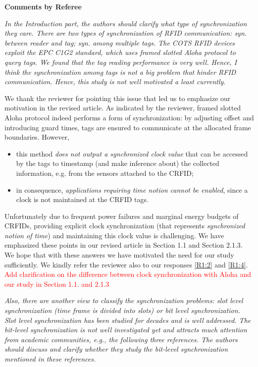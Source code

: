 \documentclass[10pt]{article}
\newcommand{\referee}[1]{
	{\item \color{OliveGreen} \emph{{#1}}}
	\label{R\therefereeCounter:\arabic{enumi}}
}
\newcommand{\response}[1]{{\color{blue} #1}}
\newcounter{refereeCounter}
\newenvironment{responses}{%
\refstepcounter{refereeCounter}%
\textbf{\large Comments by Referee \therefereeCounter}
\begin{enumerate}%
\renewcommand{\labelenumi}{\textbf{[R\therefereeCounter :\,\arabic{enumi}]}} %
}{\end{enumerate}}
\begin{document}
\begin{responses}
 
\referee{In the Introduction part, the authors should clarify what type of synchronization they care. There are two types of synchronization of RFID communication: syn. between reader and tag; syn. among multiple tags. The COTS RFID devices exploit the EPC C1G2 standard, which uses framed slotted Aloha protocol to query tags. We found that the tag reading performance is very well. Hence, I think the synchronization among tags is not a big problem that hinder RFID communication. Hence, this study is not well motivated a least currently.}

\response{
We thank the reviewer for pointing this issue that led us to emphasize our motivation in the revised article. As indicated by the reviewer, framed slotted Aloha protocol indeed performs a form of synchronization: by adjusting offset and introducing guard times, tags are ensured to communicate at the allocated frame boundaries. However, 

\begin{itemize}
	\item this method \emph{does not output a synchronized clock value} that can be accessed by the tags to timestamp (and make inference about) the collected information, e.g. from the sensors attached to the CRFID;
	\item in consequence, \emph{applications requiring time notion cannot be enabled}, since a clock is not maintained at the CRFID tags.
\end{itemize}

Unfortunately due to frequent power failures and marginal energy budgets of CRFIDs, providing explicit clock synchronization (that represents \emph{synchronized notion of time}) and maintaining this clock value is challenging. We have emphasized these points in our revised article in Section 1.1 and Section 2.1.3. We hope that with these answers we have motivated the need for our study sufficiently. We kindly refer the reviewer also to our responses \hyperref[R1:2]{[R1:2]} and \hyperref[R1:4]{[R1:4]}. \textcolor{red}{Add clarification on the difference between clock synchronization with Aloha and our study in Section 1.1. and 2.1.3}
}

\referee{Also, there are another view to classify the synchronization problems: slot level synchronization (time frame is divided into slots) or bit level synchronization. Slot level synchronization has been studied for decades and is well addressed. The bit-level synchronization is not well investigated yet and attracts much attention from academic communities, e.g., the following three references. The authors should discuss and clarify whether they study the bit-level synchronization mentioned in these references.
}


\end{responses}
\end{document}
